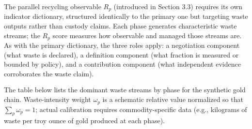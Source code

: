 \documentclass[
  11pt,
  letterpaper,
]{article}
\begin{document}
The parallel recycling observable \(R_p\) (introduced in Section 3.3)
requires its own indicator dictionary, structured identically to the
primary one but targeting waste outputs rather than custody claims. Each
phase generates characteristic waste streams; the \(R_p\) score measures
how observable and managed those streams are. As with the primary
dictionary, the three roles apply: a negotiation component (what waste
is declared), a definition component (what fraction is measured or
bounded by policy), and a contribution component (what independent
evidence corroborates the waste claim).

The table below lists the dominant waste streams by phase for the
synthetic gold chain. Waste-intensity weight \(\omega_p\) is a schematic
relative value normalized so that \(\sum_p \omega_p = 1\); actual
calibration requires commodity-specific data (e.g., kilograms of waste
per troy ounce of gold produced at each phase).
\end{document}
